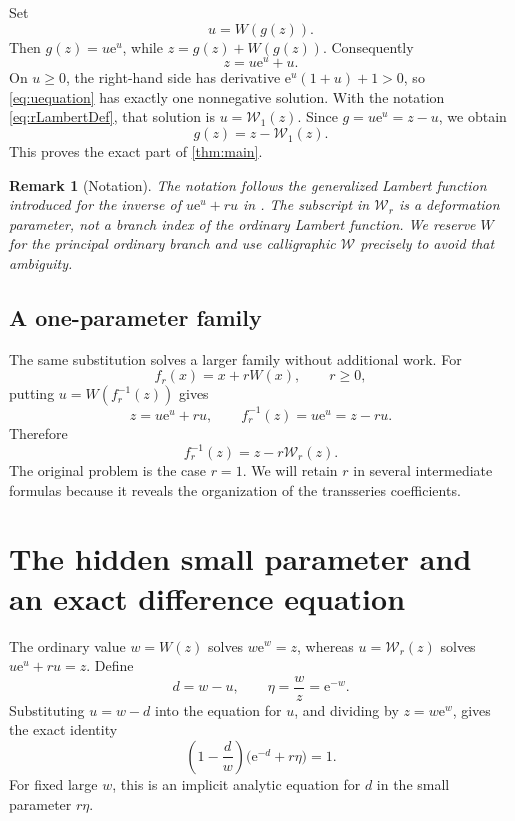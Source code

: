 \documentclass[11pt]{article}
\theoremstyle{clean}
\newtheorem{remark}[theorem]{Remark}
\newcommand{\rLambert}{\mathcal W}
\newcommand{\e}{\mathrm e}
\begin{document}
Set
\[
  u=W(g(z)).
\]
Then \(g(z)=u\e^u\), while \(z=g(z)+W(g(z))\).  Consequently
\begin{equation}\label{eq:uequation}
  z=u\e^u+u.
\end{equation}
On \(u\ge0\), the right-hand side has derivative
\(\e^u(1+u)+1>0\), so \cref{eq:uequation} has exactly one nonnegative
solution.  With the notation \cref{eq:rLambertDef}, that solution is
\(u=\rLambert_1(z)\).  Since \(g=u\e^u=z-u\), we obtain
\[
  g(z)=z-\rLambert_1(z).
\]
This proves the exact part of \cref{thm:main}.

\begin{remark}[Notation]\label{rem:notation}
The notation follows the generalized Lambert function introduced for the inverse of \(u\e^u+ru\) in \cite{MezoBaricz2017}.  The subscript in \(\rLambert_r\) is a deformation parameter, not a branch
index of the ordinary Lambert function.  We reserve \(W\) for the principal
ordinary branch and use calligraphic \(\rLambert\) precisely to avoid that
ambiguity.
\end{remark}

\subsection{A one-parameter family}

The same substitution solves a larger family without additional work.
For
\begin{equation}\label{eq:fr}
  f_r(x)=x+rW(x),\qquad r\ge0,
\end{equation}
putting \(u=W(f_r^{-1}(z))\) gives
\[
  z=u\e^u+ru,
  \qquad
  f_r^{-1}(z)=u\e^u=z-ru.
\]
Therefore
\begin{equation}\label{eq:frinverse}
  f_r^{-1}(z)=z-r\rLambert_r(z).
\end{equation}
The original problem is the case \(r=1\).  We will retain \(r\) in several
intermediate formulas because it reveals the organization of the transseries
coefficients.

\section{The hidden small parameter and an exact difference equation}

The ordinary value \(w=W(z)\) solves \(w\e^w=z\), whereas
\(u=\rLambert_r(z)\) solves \(u\e^u+ru=z\).  Define
\begin{equation}\label{eq:ddef}
  d=w-u,
  \qquad
  \eta=\frac{w}{z}=\e^{-w}.
\end{equation}
Substituting \(u=w-d\) into the equation for \(u\), and dividing by
\(z=w\e^w\), gives the exact identity
\begin{equation}\label{eq:differenceeq}
  \boxed{\quad
  \left(1-\frac{d}{w}\right)\bigl(\e^{-d}+r\eta\bigr)=1.
  \quad}
\end{equation}
For fixed large \(w\), this is an implicit analytic equation for \(d\) in the
small parameter \(r\eta\).
\end{document}
